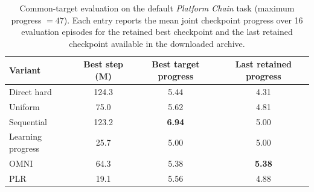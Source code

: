 \begin{table}[t]
  \centering
  \scriptsize
  \setlength{\tabcolsep}{4.6pt}
  \caption{Common-target evaluation on the default \textit{Platform Chain} task (maximum progress $=47$). Each entry reports the mean joint checkpoint progress over 16 evaluation episodes for the retained best checkpoint and the last retained checkpoint available in the downloaded archive.}
  \label{tab:curriculum_protocol_results}
  \begin{tabular}{lccc}
    \toprule
    Variant & Best step (M) & Best target progress & Last retained progress \\
    \midrule
    Direct hard & 124.3 & 5.44 & 4.31 \\
    Uniform & 75.0 & 5.62 & 4.81 \\
    Sequential & 123.2 & \textbf{6.94} & 5.00 \\
    Learning progress & 25.7 & 5.00 & 5.00 \\
    OMNI & 64.3 & 5.38 & \textbf{5.38} \\
    PLR & 19.1 & 5.56 & 4.88 \\
    \bottomrule
  \end{tabular}
\end{table}
